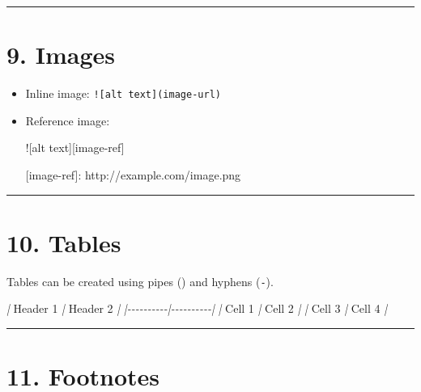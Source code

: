 \documentclass[
]{book}
\newenvironment{Shaded}{\begin{snugshade}}{\end{snugshade}}
\newcommand{\AlertTok}[1]{\textcolor[rgb]{0.94,0.16,0.16}{#1}}
\newcommand{\NormalTok}[1]{#1}
\newcommand{\OtherTok}[1]{\textcolor[rgb]{0.56,0.35,0.01}{#1}}
\newcommand{\PreprocessorTok}[1]{\textcolor[rgb]{0.56,0.35,0.01}{\textit{#1}}}
\theoremstyle{definition}
\theoremstyle{definition}
\theoremstyle{definition}
\theoremstyle{definition}
\theoremstyle{remark}
\begin{document}
\begin{center}\rule{0.5\linewidth}{0.5pt}\end{center}

\section{9. Images}\label{images}

\begin{itemize}
\item
  Inline image: \texttt{!{[}alt\ text{]}(image-url)}
\item
  Reference image:

\begin{Shaded}
\begin{Highlighting}[]
\AlertTok{![alt text][image{-}ref]}

\OtherTok{[image{-}ref]: http://example.com/image.png}
\end{Highlighting}
\end{Shaded}
\end{itemize}

\begin{center}\rule{0.5\linewidth}{0.5pt}\end{center}

\section{10. Tables}\label{tables}

Tables can be created using pipes (\texttt{\textbar{}}) and hyphens (\texttt{-}).

\begin{Shaded}
\begin{Highlighting}[]
\PreprocessorTok{|}\NormalTok{ Header 1 }\PreprocessorTok{|}\NormalTok{ Header 2 }\PreprocessorTok{|}
\PreprocessorTok{|{-}{-}{-}{-}{-}{-}{-}{-}{-}{-}|{-}{-}{-}{-}{-}{-}{-}{-}{-}{-}|}
\PreprocessorTok{|}\NormalTok{ Cell 1   }\PreprocessorTok{|}\NormalTok{ Cell 2   }\PreprocessorTok{|}
\PreprocessorTok{|}\NormalTok{ Cell 3   }\PreprocessorTok{|}\NormalTok{ Cell 4   }\PreprocessorTok{|}
\end{Highlighting}
\end{Shaded}

\begin{center}\rule{0.5\linewidth}{0.5pt}\end{center}

\section{11. Footnotes}\label{footnotes}
\end{document}
